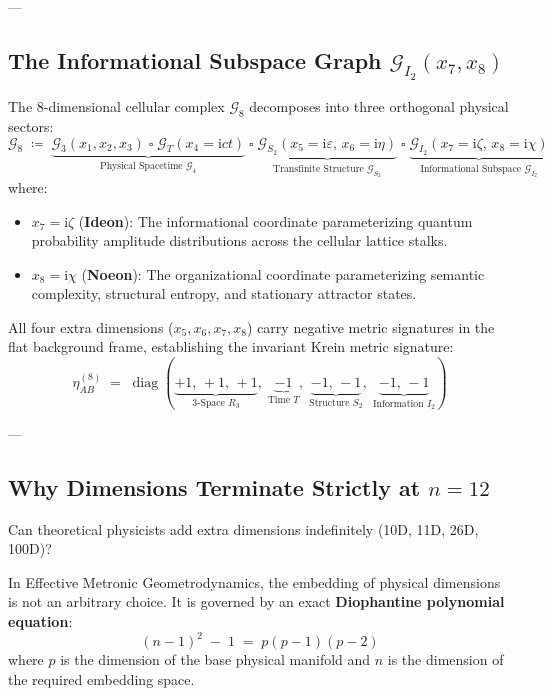 \documentclass[
    12pt,
    a4paper,
    headings=normal,
    twoside=false,
    open=any,
    parskip=half
]{scrbook}
\DeclareMathOperator{\diag}{diag}
\newcommand{\iu}{\mathrm{i}}
\begin{document}
---

\subsection{The Informational Subspace Graph $\mathcal{G}_{I_2}(x_7, x_8)$}

The 8-dimensional cellular complex $\mathcal{G}_8$ decomposes into three orthogonal physical sectors:
\begin{equation}
\mathcal{G}_8 \;\coloneqq\; \underbrace{\mathcal{G}_3(x_1, x_2, x_3) \;\square\; \mathcal{G}_T(x_4 = \iu c t)}_{\text{Physical Spacetime } \mathcal{G}_4} \;\square\; \underbrace{\mathcal{G}_{S_2}(x_5 = \iu\varepsilon, \, x_6 = \iu\eta)}_{\text{Transfinite Structure } \mathcal{G}_{S_2}} \;\square\; \underbrace{\mathcal{G}_{I_2}(x_7 = \iu\zeta, \, x_8 = \iu\chi)}_{\text{Informational Subspace } \mathcal{G}_{I_2}}
\label{eq:ch10_8d_decomposition}
\end{equation}
where:
\begin{itemize}[leftmargin=1.8em]
    \item $x_7 = \iu\zeta$ (\textbf{Ideon}): The informational coordinate parameterizing quantum probability amplitude distributions across the cellular lattice stalks.
    \item $x_8 = \iu\chi$ (\textbf{Noeon}): The organizational coordinate parameterizing semantic complexity, structural entropy, and stationary attractor states.
\end{itemize}

All four extra dimensions ($x_5, x_6, x_7, x_8$) carry negative metric signatures in the flat background frame, establishing the invariant Krein metric signature:
\begin{equation}
\eta_{AB}^{(8)} \;=\; \diag\left( \underbrace{+1, \, +1, \, +1}_{\text{3-Space } R_3}, \; \underbrace{-1}_{\text{Time } T}, \; \underbrace{-1, \, -1}_{\text{Structure } S_2}, \; \underbrace{-1, \, -1}_{\text{Information } I_2} \right)
\label{eq:ch10_8d_signature}
\end{equation}

---

\subsection{Why Dimensions Terminate Strictly at $n = 12$}

Can theoretical physicists add extra dimensions indefinitely (10D, 11D, 26D, 100D)?

In Effective Metronic Geometrodynamics, the embedding of physical dimensions is not an arbitrary choice. It is governed by an exact \textbf{Diophantine polynomial equation}:
\begin{equation}
(n - 1)^2 \;-\; 1 \;=\; p(p - 1)(p - 2)
\label{eq:ch10_hyperspace_law}
\end{equation}
where $p$ is the dimension of the base physical manifold and $n$ is the dimension of the required embedding space.
\end{document}
